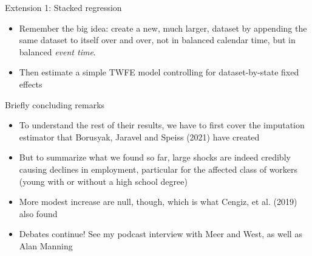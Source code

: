 \documentclass{beamer}
\begin{document}
\begin{frame}{Extension 1: Stacked regression}

\begin{itemize}
\item Remember the big idea: create a new, much larger, dataset by appending the same dataset to itself over and over, not in balanced calendar time, but in balanced \emph{event time}.
\item Then estimate a simple TWFE model controlling for dataset-by-state fixed effects
\end{itemize}

\end{frame}



\begin{frame}{Briefly concluding remarks}

\begin{itemize}
\item To understand the rest of their results, we have to first cover the imputation estimator that Borusyak, Jaravel and Speiss (2021) have created
\item But to summarize what we found so far, large shocks are indeed credibly causing declines in employment, particular for the affected class of workers (young with or without a high school degree)
\item More modest increase are null, though, which is what Cengiz, et al. (2019) also found
\item Debates continue!  See my podcast interview with Meer and West, as well as Alan Manning
\end{itemize}

\end{frame}
\end{document}
